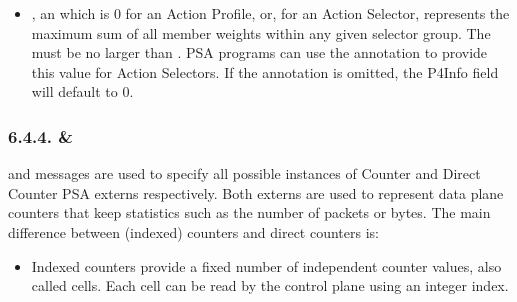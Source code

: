 \documentclass[11pt]{article}
\begin{document}
{\begin{itemize}
\item{}
, an  which is 0 for an Action Profile, or, for an
Action Selector, represents the maximum sum of all member weights within any
given selector group. The  must be no larger than . PSA
programs can use the  annotation to provide this value for
Action Selectors. If the annotation is omitted, the P4Info field will default
to 0.%
\end{itemize}%

\subsubsection{6.4.4.\hspace*{0.5em} \& }\label{sec-counter-directcounter}%

\noindent{} and  messages are used to specify all possible
instances of Counter and Direct Counter PSA externs respectively. Both externs
are used to represent data plane counters that keep statistics such as the
number of packets or bytes. The main difference between (indexed) counters and
direct counters is:%

\begin{itemize}%

\item{}
Indexed counters provide a fixed number of independent counter values, also
called cells. Each cell can be read by the control plane using an integer
index.%


\end{itemize}}
\end{document}
